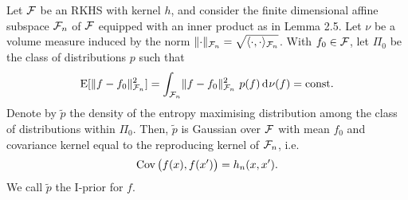 \documentclass[a4paper,showframe,11pt,draft]{report}
\begin{document}
\begin{theorem}
  Let ${\mathcal F}$ be an RKHS with kernel $h$, and consider the finite dimensional affine subspace ${\mathcal F}_n$ of ${\mathcal F}$ equipped with an inner product as in Lemma 2.5.
  Let $\nu$ be a volume measure induced by the norm $\lVert\cdot\rVert_{{\mathcal F}_n} = \sqrt{\langle\cdot,\cdot\rangle_{{\mathcal F}_n}}$.
  With $f_0 \in {\mathcal F}$, let $\Pi_0$ be the class of distributions $p$ such that 
  \[
    \operatorname{E}[\lVert f-f_0\rVert^2_{{\mathcal F}_n}] = \int_{{\mathcal F}_n} \lVert f-f_0\rVert^2_{{\mathcal F}_n} \ p(f) \operatorname{d\!\:\!}\nu(f) = \text{const.}
  \]
  Denote by $\tilde p$ the density of the entropy maximising distribution among the class of distributions within $\Pi_0$.
  Then, $\tilde p$ is Gaussian over ${\mathcal F}$ with mean $f_0$ and covariance kernel equal to the reproducing kernel of ${\mathcal F}_n$, i.e.
  \[
    \operatorname{Cov}\big(f(x),f(x')\big) = h_n(x,x').
  \]
  We call $\tilde p$ the I-prior for $f$.
\end{theorem}
\end{document}
